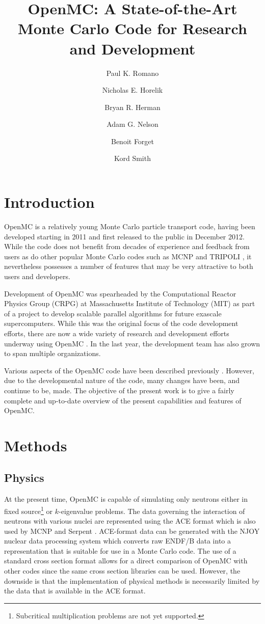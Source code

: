 \documentclass{snamc2013}
\title{OpenMC: A State-of-the-Art Monte Carlo Code for Research and
  Development}
\author[1]{Paul K. Romano}
\author[1]{Nicholas E. Horelik}
\author[1]{Bryan R. Herman}
\author[2]{Adam G. Nelson}
\author[1]{Benoit Forget}
\author[1]{Kord Smith}
\affil[1]{Massachusetts Institute of Technology, Department of Nuclear Science
  and Engineering, 77 Massachusetts Avenue, Cambridge, MA 02139}
\affil[2]{University of Michigan, Department of Nuclear Engineering and
  Radiological Sciences, 2355 Bonisteel Boulevard, Ann Arbor, MI 48104}
\begin{document}
\section{Introduction}

OpenMC is a relatively young Monte Carlo particle transport code, having been
developed starting in 2011 and first released to the public in December
2012. While the code does not benefit from decades of experience and feedback
from users as do other popular Monte Carlo codes such as MCNP
\cite{lanl-brown-2010} and TRIPOLI \cite{phytra-diop-2007}, it nevertheless
possesses a number of features that may be very attractive to both users and
developers.

Development of OpenMC was spearheaded by the Computational Reactor Physics Group
(CRPG) at Massachusetts Institute of Technology (MIT) as part of a project to
develop scalable parallel algorithms for future exascale supercomputers. While
this was the original focus of the code development efforts, there are now a
wide variety of research and development efforts underway using OpenMC
\cite{mc-romano-2013, mc-nelson-2013, jcp-siegel-2013, ijhpca-siegel-2013}. In
the last year, the development team has also grown to span multiple
organizations.

Various aspects of the OpenMC code have been described previously
\cite{ane-romano-2013, mc-romano-2013}. However, due to the developmental nature
of the code, many changes have been, and continue to be, made. The objective of
the present work is to give a fairly complete and up-to-date overview of the
present capabilities and features of OpenMC.

\section{Methods}

\subsection{Physics}

At the present time, OpenMC is capable of simulating only neutrons either in
fixed source\footnote{Subcritical multiplication problems are not yet
  supported.} or $k$-eigenvalue problems. The data governing the interaction of
neutrons with various nuclei are represented using the ACE format
\cite{lanl-x5-2008-ace} which is also used by MCNP and Serpent
\cite{vtt-leppanen-2012}. ACE-format data can be generated with the NJOY nuclear
data processing system \cite{lanl-macfarlane-1994} which converts raw ENDF/B
data into a representation that is suitable for use in a Monte Carlo code. The
use of a standard cross section format allows for a direct comparison of OpenMC
with other codes since the same cross section libraries can be used. However,
the downside is that the implementation of physical methods is necessarily
limited by the data that is available in the ACE format.
\end{document}

